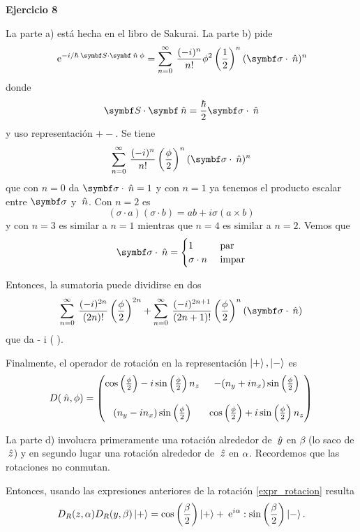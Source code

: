 \documentclass[10pt,oneside]{CBFT_book}
\begin{document}
\begin{ejemplo}{\bf Ejercicio 8}

La parte a) está hecha en el libro de Sakurai.
La parte b) pide
\[
	\euler^{-i/\hbar \: \pe{S}{\nver} \: \phi } =
	\sum_{n=0}^\infty \: \frac{(-i)^n}{n!} \phi^2 \Frac{1}{2}^n (\vb{\sigma}\cdot\nver)^n
\]
donde 
\[
	\pe{S}{\nver} = \frac{\hbar}{2} \vb{\sigma}\cdot\nver
\]
y uso representación $+ -$. Se tiene
\[
	\sum_{n=0}^\infty \: \frac{(-i)^n}{n!} \Frac{\phi}{2}^n (\vb{\sigma}\cdot\nver)^n
\]
que con $n=0$ da $\vb{\sigma}\cdot\nver=1$ y con $n=1 $ ya tenemos el producto escalar entre
$\vb{\sigma}$ y $\:\hat{n}$. Con $n=2$ es
\[
	( \sigma\cdot a )( \sigma\cdot b ) = ab + i \sigma(a\times b)
\]
y con $n=3$ es similar a $n=1$ mientras que $n=4$ es similar a $n=2$. Vemos que
\[
	\vb{\sigma}\cdot\nver = \begin{cases}
		1		& \text{ par } \\
		\boldmath{\sigma}\cdot n & \text{ impar}
	\end{cases}
\]

Entonces, la sumatoria puede dividirse en dos
\[
	\sum_{n=0}^\infty \: \frac{(-i)^{2n}}{(2n)!} \Frac{\phi}{2}^{2n} +
	\sum_{n=0}^\infty \: \frac{(-i)^{2n+1}}{(2n+1)!} \Frac{\phi}{2}^n (\vb{\sigma}\cdot\nver)
\]
que da
\be
	 \cos{} - i \: \sin{} ( \vb{\sigma}\cdot\nver ).
	\label{expr_rotacion}
\ee

Finalmente, el operador de rotación en la representación $\Ket{+}, \Ket{-}$ es
\[
	D(\:\hat{n},\phi) = 
	\begin{pmatrix}
	\cos\left( \frac{ \phi }{ 2 } \right) - i \sin\left( \frac{ \phi }{ 2 } \right) n_z	&  -( n_y + i n_x) \sin\left( \frac{ \phi }{ 2 } \right) \\
			\\
	( n_y - i n_x) \sin\left( \frac{ \phi }{ 2 } \right) &  \cos\left( \frac{ \phi }{ 2 } \right) + i \sin\left( \frac{ \phi }{ 2 } \right) n_z \\
	\end{pmatrix}
\]

La parte d) involucra primeramente una rotación alrededor de $\:\hat{y}$ en $\beta$ (lo saco
de $\:\hat{z}$) y en segundo lugar una rotación alrededor de $\:\hat{z}$ en $\alpha$.
Recordemos que las rotaciones no conmutan.

Entonces, usando las expresiones anteriores de la rotación \eqref{expr_rotacion} resulta
\[
	D_R(z,\alpha) D_R(y,\beta) \Ket{+} = 
	\cos\left( \frac{ \beta }{ 2 } \right) \Ket{+} + \:\mathrm{e}^{i\alpha} : \sin\left( \frac{ \beta }{ 2 } \right)  \Ket{-}.
\]

 
\end{ejemplo}
\end{document}
